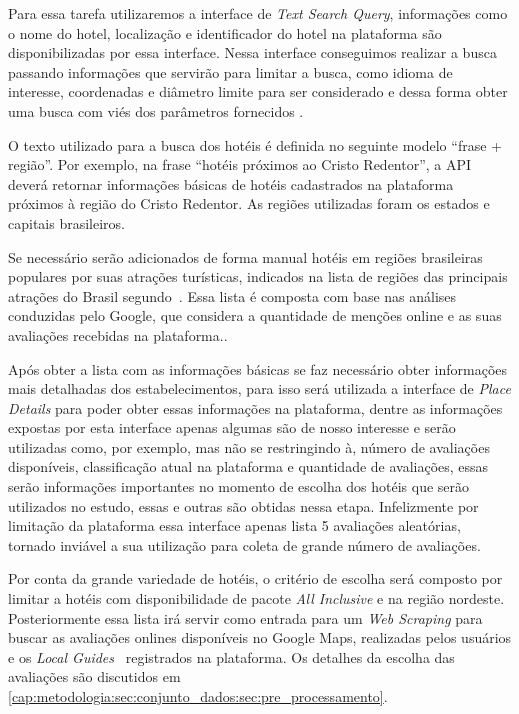 Para essa tarefa utilizaremos a interface de \emph{Text Search Query}, informações como o nome do hotel, localização e identificador do hotel na plataforma são disponibilizadas por essa interface. Nessa interface conseguimos realizar a busca passando informações que servirão para limitar a busca, como idioma de interesse, coordenadas e diâmetro limite para ser considerado e dessa forma obter uma busca com viés dos parâmetros fornecidos \cite{placesSearchText2023}.



O texto utilizado para a busca dos hotéis é definida no seguinte modelo “frase + região”. Por exemplo, na frase “hotéis próximos ao Cristo Redentor”, a API deverá retornar informações básicas de hotéis cadastrados na plataforma próximos à região do Cristo Redentor. As regiões utilizadas foram os estados e capitais brasileiros.

Se necessário serão adicionados de forma manual hotéis em regiões brasileiras populares por suas atrações turísticas, indicados na lista de regiões das principais atrações do Brasil segundo~. Essa lista é composta com base nas análises conduzidas pelo Google, que considera a quantidade de menções online e as suas avaliações recebidas na plataforma..

Após obter a lista com as informações básicas se faz necessário obter informações mais detalhadas dos estabelecimentos, para isso será utilizada a interface de \emph{Place Details} para poder obter essas informações na plataforma, dentre as informações expostas por esta interface apenas algumas são de nosso interesse e serão utilizadas como, por exemplo, mas não se restringindo à, número de avaliações disponíveis, classificação atual na plataforma e quantidade de avaliações, essas serão informações importantes no momento de escolha dos hotéis que serão utilizados no estudo, essas e outras são obtidas nessa etapa. Infelizmente por limitação da plataforma essa interface apenas lista 5 avaliações aleatórias, tornado inviável a sua utilização para coleta de grande número de avaliações.



Por conta da grande variedade de hotéis, o critério de escolha será composto por limitar a hotéis com disponibilidade de pacote \emph{All Inclusive} e na região nordeste. Posteriormente essa lista irá servir como entrada para um \emph{Web Scraping} para buscar as avaliações onlines disponíveis no Google Maps, realizadas pelos usuários e os \emph{Local Guides}~\cite{google2022localguides} registrados na plataforma. Os detalhes da escolha das avaliações são discutidos em \ref{cap:metodologia:sec:conjunto_dados:sec:pre_processamento}.

